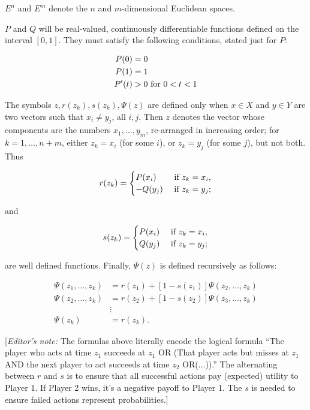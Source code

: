 \documentclass{article}
\begin{document}
$E^n$ and $E^m$ denote the $n$ and $m$-dimensional Euclidean spaces.

$P$ and $Q$ will be real-valued, continuously differentiable functions
defined on the interval $[0,1]$. They must satisfy the following conditions,
stated just for $P$:

\[
\begin{aligned}
P(0) &= 0 \\ P(1) &= 1 \\ P'(t) &> 0 \textup{ for } 0 < t < 1
\end{aligned}
\]

The symbols $z, r(z_k), s(z_k), \Psi(z)$ are defined only when $x \in X$ and
$y \in Y$ are two vectors such that $x_i \neq y_j$, all $i, j$. Then $z$
denotes the vector whose components are the numbers $x_1, \dots, y_m$,
re-arranged in increasing order; for $k = 1, \dots, n+m$, either $z_k = x_i$
(for some $i$), or $z_k = y_j$ (for some $j$), but not both. Thus

\[
r(z_k) = \begin{cases}
P(x_i) & \textup{ if } z_k = x_i, \\
-Q(y_j) & \textup{ if } z_k = y_j;
\end{cases}
\]

and

\[
s(z_k) = \begin{cases}
P(x_i) & \textup{ if } z_k = x_i, \\
Q(y_j) & \textup{ if } z_k = y_j;
\end{cases}
\]

are well defined functions. Finally, $\Psi(z)$ is defined recursively as
follows:

\[
\begin{aligned}
\Psi(z_1, \dots, z_k) &= r(z_1) + [1 - s(z_1)] \Psi(z_2, \dots, z_k) \\
\Psi(z_2, \dots, z_k) &= r(z_2) + [1 - s(z_2)] \Psi(z_3, \dots, z_k) \\
& \vdots \\
\Psi(z_k) &= r(z_k).
\end{aligned}
\]

[\emph{Editor's note:} The formulas above literally encode the logical formula
``The player who acts at time $z_1$ succeeds at $z_1$ OR (That player acts but
misses at $z_1$ AND the next player to act succeeds at time $z_2$
OR($\dots$)).'' The alternating between $r$ and $s$ is to ensure that all
successful actions pay (expected) utility to Player 1. If Player 2 wins, it's a
negative payoff to Player 1. The $s$ is needed to ensure failed actions
represent probabilities.]
\end{document}
